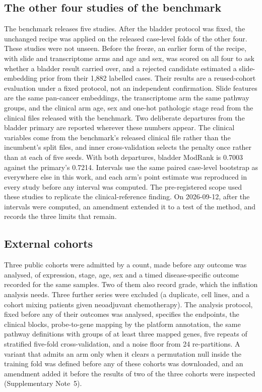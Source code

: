 \documentclass[pdflatex,sn-nature]{sn-jnl}
\begin{document}
\subsection*{The other four studies of the benchmark}

The benchmark releases five studies. After the bladder protocol was fixed, the unchanged recipe was
applied on the released case-level folds of the other four. These studies were not unseen. Before
the freeze, an earlier form of the recipe, with slide and transcriptome arms and age and sex, was
scored on all four to ask whether a bladder result carried over, and a rejected candidate estimated a
slide-embedding prior from their 1,882 labelled cases. Their results are a reused-cohort evaluation
under a fixed protocol, not an independent confirmation. Slide features are the same pan-cancer embeddings,
the transcriptome arm the same pathway groups, and the clinical arm age, sex and one-hot pathologic
stage read from the clinical files released with the benchmark. Two deliberate departures from the
bladder primary are reported wherever these numbers appear. The clinical variables come from the
benchmark's released clinical file rather than the incumbent's split files, and inner
cross-validation selects the penalty once rather than at each of five seeds. With both departures,
bladder ModRank is 0.7003 against the primary's 0.7214. Intervals use the same paired case-level
bootstrap as everywhere else in this work, and each arm's point estimate was reproduced in every study
before any interval was computed. The pre-registered scope used these studies to replicate the
clinical-reference finding. On 2026-09-12, after the intervals were computed, an amendment extended it
to a test of the method, and records the three limits that remain.

\subsection*{External cohorts}

Three public cohorts were admitted by a count, made before any outcome was analysed, of expression,
stage, age, sex and a timed disease-specific outcome recorded for the same samples. Two of them also
record grade, which the inflation analysis needs. Three further series were excluded (a duplicate,
cell lines, and a cohort mixing patients given neoadjuvant chemotherapy). The analysis protocol, fixed
before any of their outcomes was analysed, specifies the endpoints, the clinical blocks, probe-to-gene
mapping by the platform annotation, the same pathway definitions with groups of at least three
mapped genes, five repeats of stratified five-fold cross-validation, and a noise floor from 24
re-partitions. A variant that admits an arm only when it clears a permutation null inside the training
fold was defined before any of these cohorts was downloaded, and an amendment added it before the
results of two of the three cohorts were inspected (Supplementary Note~5).
\end{document}

